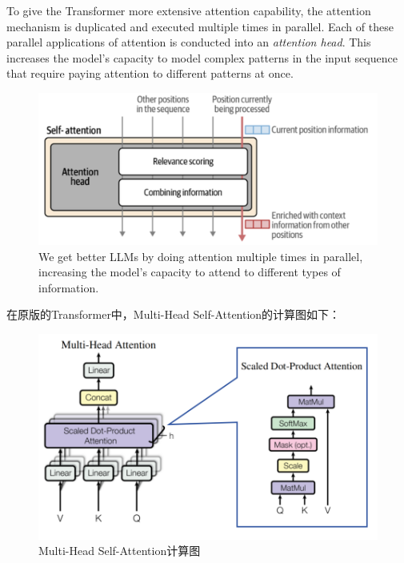 To give the Transformer more extensive attention capability, the attention mechanism is {\color{tred}duplicated and executed multiple times in parallel}. Each of these parallel applications of attention is conducted into an {\color{dblue}\textit{attention head}}. This increases the model’s capacity to model complex patterns in the input sequence that require paying attention to different patterns at once.

\begin{figure}[htbp]
  \centering
  \includegraphics[width=0.6\linewidth]{figs/lec2/lec2.10.png}
  \caption{We get better LLMs by doing attention multiple times in parallel, increasing the model’s capacity to attend to different types of information.}
  \label{fig:Multi-Head Attention}
\end{figure}

\clearpage  
在原版的Transformer中，Multi-Head Self-Attention的计算图如下：
\begin{figure}[htbp]
  \centering
  \includegraphics[width=0.75\linewidth]{figs/lec2/lec2.11.png}
  \caption{Multi-Head Self-Attention计算图}
  \label{fig:Multi-Head Self-Attention计算图}
\end{figure}



